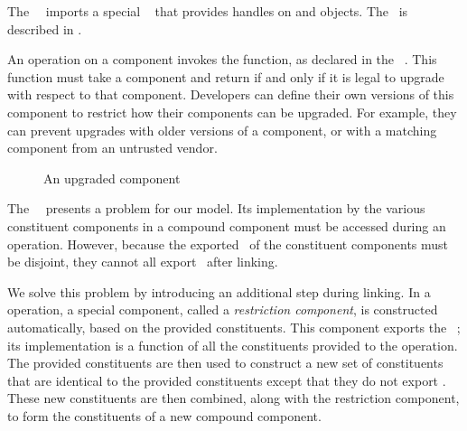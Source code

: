 The \upgapi\ \apiN\ imports a special \apiN\  that
provides handles on  and  objects.
The  \apiN\ is described
in .

An  operation on a component
invokes the  function,
as declared in the \apiN\ \upgapi.
This function must take a component and return 
if and only if it is legal to upgrade with respect to that component.
Developers can define their own versions of this component
to restrict how their components can be upgraded.
For example,
they can prevent upgrades with older versions of a component,
or with a matching component from an untrusted vendor.

\begin{figure*}
\begin{center}

\end{center}
\caption{An upgraded component}
\end{figure*}

The \upgapi\ \apiN\ presents a problem for our model. Its implementation
by the various constituent components in a compound
component must be accessed during an  operation.
However, because the exported \apisN\ of the constituent components must
be disjoint, they cannot all export \upgapi\ after linking.

We solve this problem by introducing an additional step during linking.
In a  operation,
a special component, called a \emph{restriction component},
is constructed automatically, based on the provided constituents.
This component exports the \upgapi\ \apiN;
its implementation is a function
of all the constituents provided to the  operation.
The provided constituents are then used to construct a new set
of constituents that are identical to the provided constituents
except that they do not export \upgapi.
These new constituents are then combined,
along with the restriction component,
to form the constituents of a new compound component.

